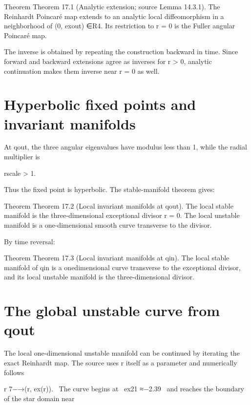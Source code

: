 \begin{statementbox}{Theorem}
Theorem 17.1 (Analytic extension; source Lemma 14.3.1). The Reinhardt Poincaré map extends to an analytic local diffeomorphism in a neighborhood of (0, exout) ∈R4. Its restriction to r = 0 is the Fuller angular Poincaré map.
\end{statementbox}

The inverse is obtained by repeating the construction backward in time. Since forward and backward extensions agree as inverses for r > 0, analytic continuation makes them inverse near r = 0 as well.


\section{Hyperbolic fixed points and invariant manifolds}

At qout, the three angular eigenvalues have modulus less than 1, while the radial multiplier is


rscale > 1.


Thus the fixed point is hyperbolic. The stable-manifold theorem gives:


\begin{statementbox}{Theorem}
Theorem 17.2 (Local invariant manifolds at qout). The local stable manifold is the three-dimensional exceptional divisor r = 0. The local unstable manifold is a one-dimensional smooth curve transverse to the divisor.
\end{statementbox}

By time reversal:


\begin{statementbox}{Theorem}
Theorem 17.3 (Local invariant manifolds at qin). The local stable manifold of qin is a onedimensional curve transverse to the exceptional divisor, and its local unstable manifold is the three-dimensional divisor.
\end{statementbox}

\section{The global unstable curve from qout}

The local one-dimensional unstable manifold can be continued by iterating the exact Reinhardt map. The source uses r itself as a parameter and numerically follows


\begin{displaytext}
r 7−→(r, ex(r)). \
The curve begins at \
ex21 ≈−2.39 \
and reaches the boundary of the star domain near
\end{displaytext}

